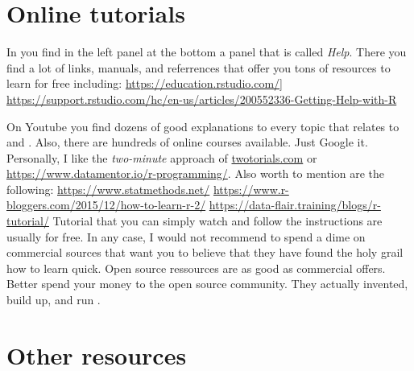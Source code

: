 \section{Online tutorials}

In \Rstudio you find in the left panel at the bottom a panel that is called \textit{Help}. There you find a lot of links, manuals, and referrences that offer you tons of resources to learn \R for free including:
\websmall\url{https://education.rstudio.com/}] 
\websmall\url{https://support.rstudio.com/hc/en-us/articles/200552336-Getting-Help-with-R}

On Youtube you find dozens of good explanations to every topic that relates to \R and \Rstudio. Also, there are hundreds of online courses available. Just Google it. Personally, I like the \textit{two-minute} approach of \websmall\url{twotorials.com} or \websmall\url{https://www.datamentor.io/r-programming/}. Also worth  to mention are the following: \websmall\url{https://www.statmethods.net/} \websmall\url{https://www.r-bloggers.com/2015/12/how-to-learn-r-2/} \websmall\url{https://data-flair.training/blogs/r-tutorial/}
Tutorial that you can simply watch and follow the instructions are usually for free. In any case, I would not recommend to spend a dime on commercial sources that want you to believe that they have found the holy grail how to learn \R quick. Open source ressources are as good as commercial offers. Better spend your money to the open source community. They actually invented, build up, and run \R. 




\section{Other resources}

